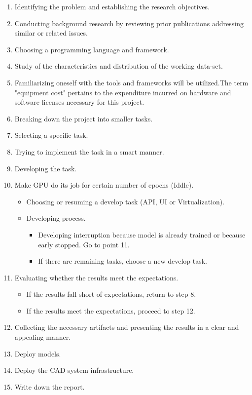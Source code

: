 \begin{enumerate}

    \item Identifying the problem and establishing the research objectives.
    \item Conducting background research by reviewing prior publications addressing similar or related issues.
    \item Choosing a programming language and framework.
    \item Study of the characteristics and distribution of the working data-set.
    \item Familiarizing oneself with the tools and frameworks will be utilized.The term "equipment cost" pertains to the expenditure incurred on hardware and software licenses necessary for this project.
    \item Breaking down the project into smaller tasks.
    \item Selecting a specific task.
    \item Trying to implement the task in a smart manner.
    \item Developing the task.
    \item Make GPU do its job for certain number of epochs (Iddle).

        \begin{itemize}
            \item Choosing or resuming a develop task (API, UI or Virtualization).
            \item Developing process.
                \begin{itemize}
                    \item Developing interruption because model is already trained or because early stopped. Go to point 11.
                     \item If there are remaining tasks, choose a new develop task.
                \end{itemize}
        \end{itemize}


    \item Evaluating whether the results meet the expectations.

        \begin{itemize}
            \item If the results fall short of expectations, return to step 8.
            \item If the results meet the expectations, proceed to step 12.
        \end{itemize}

    \item Collecting the necessary artifacts and presenting the results in a clear and appealing manner.

    \item Deploy models.

    \item Deploy the CAD system infrastructure.

    \item Write down the report.

\end{enumerate}

